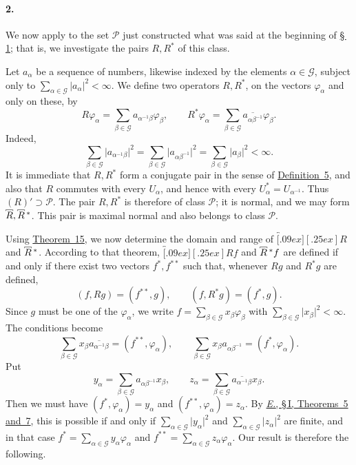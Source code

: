 \documentclass[
  paper=b5,
  twoside=true,
  fontsize=13pt,
  headings=normal,
  bookmarkpackage=false
]{scrartcl}
\theoremstyle{definition}
\newcommand{\TheoremRef}[1]{\hyperref[thm:#1]{Theorem~#1}}
\newcommand{\ErefText}[1]{\href{https://doi.org/10.1007/BF01782338}{#1}}
\newcommand{\MaximalExtension}[1]{\overbracket[.09ex][.25ex]{#1}}
\newcommand{\AdjointMaximalExtension}[1]{\MaximalExtension{#1}\vphantom{#1}^{*}}
\begin{document}
\paragraph*{2.}
\label{app:II-2}

We now apply to the set \(\mathcal P\) just constructed what was said at
the beginning of \hyperref[app:II-1]{\S\,1}; that is, we investigate the pairs \(R,R^{*}\) of
this class.

Let \(a_{\alpha}\) be a sequence of numbers, likewise indexed by the
elements \(\alpha\in \mathcal G\), subject only to
\(\sum_{\alpha\in \mathcal G}\lvert a_{\alpha}\rvert^{2}<\infty\). We define two operators \(R,R^{*}\), on the vectors
\(\varphi_{\alpha}\) and only on these, by
\[
  R\varphi_{\alpha}
  =
  \sum_{\beta\in \mathcal G}a_{\alpha^{-1}\beta}\varphi_{\beta},
  \qquad
  R^{*}\varphi_{\alpha}
  =
  \sum_{\beta\in \mathcal G}\overline{a_{\alpha\beta^{-1}}}\varphi_{\beta}.
\]
Indeed,
\[
  \sum_{\beta\in \mathcal G}\lvert a_{\alpha^{-1}\beta}\rvert^{2}
  =
  \sum_{\beta\in \mathcal G}\lvert a_{\alpha\beta^{-1}}\rvert^{2}
  =
  \sum_{\beta\in \mathcal G}\lvert a_{\beta}\rvert^{2}
  <\infty.
\]
It is immediate that \(R,R^{*}\) form a conjugate pair in the sense of
\hyperref[def:conjugate-pair]{Definition~5}, and also that \(R\) commutes
with every \(U_{\alpha}\), and
hence with every \(U_{\alpha}^{*}=U_{\alpha^{-1}}\).  Thus
\((R)'\supset\mathcal P\).  The pair \(R,R^{*}\) is therefore of class
\(\mathcal P\); it is normal, and we may form
\(\MaximalExtension{R},\AdjointMaximalExtension{R}\).  This pair is maximal normal and also
belongs to class \(\mathcal P\).

Using \TheoremRef{15}, we now determine the domain and range of
\(\MaximalExtension{R}\) and \(\AdjointMaximalExtension{R}\).  According to that theorem,
\(\MaximalExtension{R}f\) and \(\AdjointMaximalExtension{R}f\) are defined if and only if
there exist two vectors \(f^{*},f^{**}\) such that, whenever \(Rg\) and
\(R^{*}g\) are defined,
\[
  (f,Rg)=(f^{**},g),
  \qquad
  (f,R^{*}g)=(f^{*},g).
\]
Since \(g\) must be one of the \(\varphi_{\alpha}\), we write
\(f=\sum_{\beta\in \mathcal G}x_{\beta}\varphi_{\beta}\) with
\(\sum_{\beta\in \mathcal G}\lvert x_{\beta}\rvert^{2}<\infty\). The conditions become
\[
  \sum_{\beta\in \mathcal G}
  x_{\beta}\overline{a_{\alpha^{-1}\beta}}
  =
  (f^{**},\varphi_{\alpha}),
  \qquad
  \sum_{\beta\in \mathcal G}
  x_{\beta}a_{\alpha\beta^{-1}}
  =
  (f^{*},\varphi_{\alpha}).
\]
Put
\[
  y_{\alpha}
  =
  \sum_{\beta\in \mathcal G}a_{\alpha\beta^{-1}}x_{\beta},
  \qquad
  z_{\alpha}
  =
  \sum_{\beta\in \mathcal G}\overline{a_{\alpha^{-1}\beta}}x_{\beta}.
\]
Then we must have \((f^{*},\varphi_{\alpha})=y_{\alpha}\) and
\((f^{**},\varphi_{\alpha})=z_{\alpha}\). By
\ErefText{\emph{E.}, \S\,I, Theorems~5 and~7}, this is possible if and only if
\(\sum_{\alpha\in \mathcal G}\lvert y_{\alpha}\rvert^{2}\) and
\(\sum_{\alpha\in \mathcal G}\lvert z_{\alpha}\rvert^{2}\) are finite, and in that case
\(f^{*}=\sum_{\alpha\in \mathcal G}y_{\alpha}\varphi_{\alpha}\) and
\(f^{**}=\sum_{\alpha\in \mathcal G}z_{\alpha}\varphi_{\alpha}\). Our result is
therefore the following.
\end{document}
